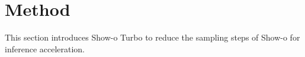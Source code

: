 




\section{Method}
\label{sec:method}
This section introduces Show-o Turbo to reduce the sampling steps of Show-o for inference acceleration. 

